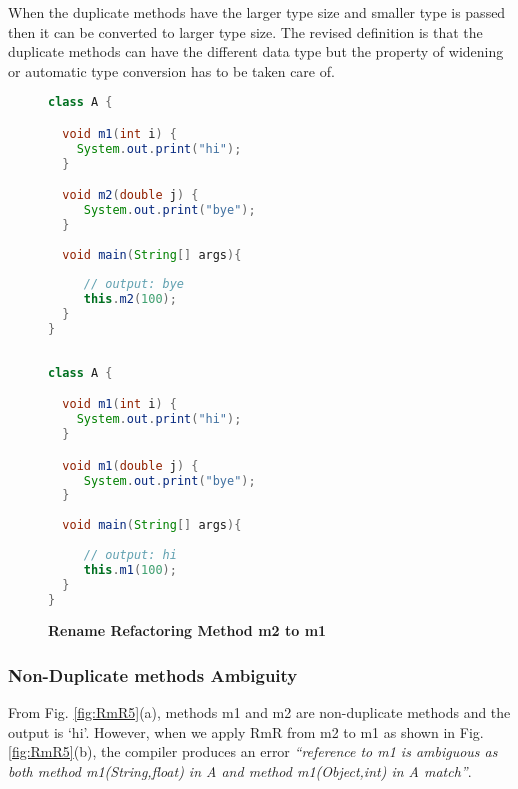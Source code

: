 When the duplicate methods have the larger type size and smaller type is passed then it can be converted to larger type size. The revised definition is that the duplicate methods can have the different data type but the property of widening or automatic type conversion has to be taken care of.

\begin{figure}[th]
\centering
\begin{minipage}[t]{0.47\linewidth}
\begin{lstlisting}[language=java, basicstyle=\scriptsize\ttfamily,frame=single]
class A {

  void m1(int i) {	
    System.out.print("hi");
  }

  void m2(double j) {	
     System.out.print("bye");
  }	
  
  void main(String[] args){
	
     // output: bye
     this.m2(100); 
  }
}
 
\end{lstlisting}
\end{minipage}
\hfill
\begin{minipage}[t]{0.47\linewidth}
\begin{lstlisting}[language=java, basicstyle=\scriptsize\ttfamily,frame=single]
class A {

  void m1(int i) {	
    System.out.print("hi");
  }

  void m1(double j) {	
     System.out.print("bye");
  }	
  
  void main(String[] args){
	
     // output: hi
     this.m1(100); 
  }
}

\end{lstlisting}
\end{minipage}
\caption{\textbf{Rename Refactoring Method m2 to m1}}
\label{fig:RmR4}
\end{figure}

\subsubsection {Non-Duplicate methods Ambiguity} 
From Fig. \ref{fig:RmR5}(a), methods m1 and m2 are non-duplicate methods and the output is `hi'. However, when we apply RmR from m2 to m1 as shown in Fig. \ref{fig:RmR5}(b), the compiler produces an error \textsl{``reference to m1 is ambiguous as both method m1(String,float) in A and method m1(Object,int) in A match''}. 

